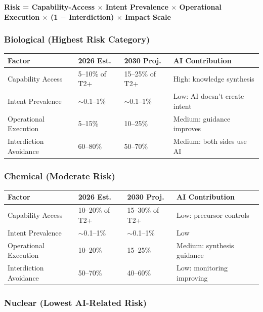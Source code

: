 \documentclass[11pt,letterpaper]{article}
\begin{document}
\textbf{Risk = Capability-Access $\times$ Intent Prevalence $\times$ Operational Execution $\times$ (1 $-$ Interdiction) $\times$ Impact Scale}

\subsubsection*{Biological (Highest Risk Category)}

\begin{center}
\small
\begin{tabular}{L{3cm}L{2.5cm}L{2.5cm}L{4cm}}
\toprule
\textbf{Factor} & \textbf{2026 Est.} & \textbf{2030 Proj.} & \textbf{AI Contribution} \\
\midrule
Capability Access & 5--10\% of T2+ & 15--25\% of T2+ & High: knowledge synthesis \\
Intent Prevalence & $\sim$0.1--1\% & $\sim$0.1--1\% & Low: AI doesn't create intent \\
Operational Execution & 5--15\% & 10--25\% & Medium: guidance improves \\
Interdiction Avoidance & 60--80\% & 50--70\% & Medium: both sides use AI \\
\bottomrule
\end{tabular}
\end{center}

\subsubsection*{Chemical (Moderate Risk)}

\begin{center}
\small
\begin{tabular}{L{3cm}L{2.5cm}L{2.5cm}L{4cm}}
\toprule
\textbf{Factor} & \textbf{2026 Est.} & \textbf{2030 Proj.} & \textbf{AI Contribution} \\
\midrule
Capability Access & 10--20\% of T2+ & 15--30\% of T2+ & Low: precursor controls \\
Intent Prevalence & $\sim$0.1--1\% & $\sim$0.1--1\% & Low \\
Operational Execution & 10--20\% & 15--25\% & Medium: synthesis guidance \\
Interdiction Avoidance & 50--70\% & 40--60\% & Low: monitoring improving \\
\bottomrule
\end{tabular}
\end{center}

\subsubsection*{Nuclear (Lowest AI-Related Risk)}
\end{document}
